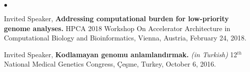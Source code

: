 \documentclass[margin,line]{res}
\newenvironment{list2}{
  \begin{list}{$\bullet$}{%
      \setlength{\itemsep}{0.1cm}
      \setlength{\parsep}{0in} \setlength{\parskip}{0in}
      \setlength{\topsep}{0in} \setlength{\partopsep}{0in} 
      \setlength{\leftmargin}{0.2in}}}{\end{list}}
\newcommand{\junk}[1]{}
\begin{document}
\begin{resume}
\begin{list2}
\item
  Invited Speaker, 
  {\bf Addressing computational burden for low-priority genome analyses.}
  HPCA 2018 Workshop On Accelerator Architecture in Computational Biology and Bioinformatics,
  Vienna, Austria, February 24, 2018.

\junk{
\item
  Lecture, 
  {\bf  Next-generation sequence characterization of complex genome structural variation.}
  Computational Genomics Summer Institute, University of California, Los Angeles, CA, United States,
  July 11, 2017.
}
  \junk{

\item
  Invited Speaker, 
  {\bf Kodlamayan genomu anlamlandırmak.} {\it (in Turkish)}
  3$^{rd}$ Course on Neurogenetics, İstanbul, Turkey, June 1, 2017.
  
  
\item
  Invited Speaker, 
  {\bf Discovery of large genomic inversions using long-range information.}
  Institute for Molecular Medicine, University of Lisboa, Lisbon, Portugal, April 7, 2017.
\item
  Invited Speaker, 
  {\bf Discovery of large genomic inversions using long-range information.}
  Institute for Computational Biomedicine, Weill Cornell Medicine, New York, NY, USA, January 27, 2017.
  }
\item
  Invited Speaker, 
  {\bf Kodlamayan genomu anlamlandırmak.} {\it (in Turkish)}
  12$^{th}$ National Medical Genetics Congress, Çeşme, Turkey, October 6, 2016.

    \junk{

}
\end{list2}
\end{resume}
\end{document}
